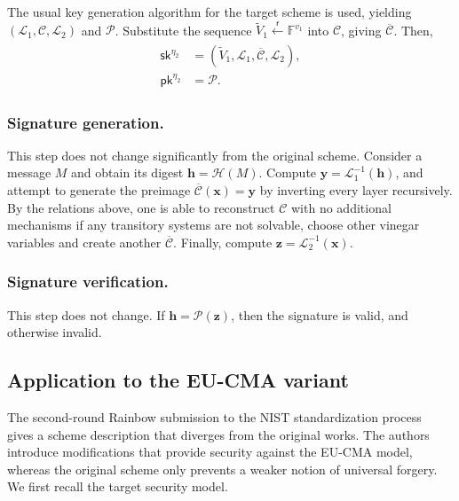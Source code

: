 \documentclass[english]{ufsc-thesis-rn46-2019/ufsc-thesis-rn46-2019}
\newcommand{\random}{\overset{\mathsf{r}}{\gets}}
\theoremstyle{definition}
\begin{document}
The usual key generation algorithm for the target scheme is used, yielding
$(\mathcal{L}_{1}, \mathcal{C}, \mathcal{L}_{2})$ and $\mathcal{P}$. Substitute
the sequence $\widetilde{V}_{1} \random \mathbb{F}^{v_{1}}$ into $\mathcal{C}$,
giving $\overline{\mathcal{C}}$. Then,
\begin{align}
  \begin{split}
    \mathsf{sk}^{\eta_{2}}
      &= (\widetilde{V}_{1}, \mathcal{L}_{1}, \overline{\mathcal{C}},
        \mathcal{L}_{2}), \\
    \mathsf{pk}^{\eta_{2}}
      &= \mathcal{P}.
  \end{split}
\end{align}

\subsubsection{Signature generation.}

This step does not change significantly from the original scheme. Consider
a message $M$ and obtain its digest $\mathbf{h} = \mathcal{H}(M)$. Compute
$\mathbf{y} = \mathcal{L}_{1}^{-1}(\mathbf{h})$, and attempt to generate the
preimage $\overline{\mathcal{C}}(\mathbf{x}) = \mathbf{y}$ by inverting every
layer recursively. By the relations above, one is able to reconstruct
$\mathcal{C}$ with no additional mechanisms if any transitory systems are not
solvable, choose other vinegar variables and create another
$\overline{\mathcal{C}}$. Finally, compute
$\mathbf{z} = \mathcal{L}_{2}^{-1}(\mathbf{x})$.

\subsubsection{Signature verification.}

This step does not change. If $\mathbf{h} = \mathcal{P}(\mathbf{z})$, then the
signature is valid, and otherwise invalid.

\subsection{Application to the EU-CMA variant}

The second-round Rainbow submission to the NIST standardization
process~\cite{Ding:201901} gives a scheme description that diverges from the
original works. The authors introduce modifications that provide security
against the \textsf{EU-CMA} model, whereas the original scheme only prevents
a weaker notion of universal forgery. We first recall the target security
model.
\end{document}
